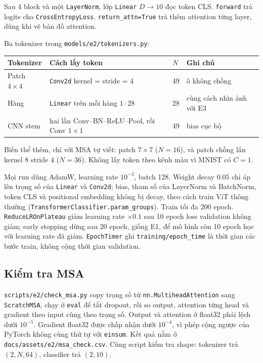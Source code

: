 Sau 4 block và một \texttt{LayerNorm}, lớp \texttt{Linear} \(D\to 10\) đọc token CLS. \texttt{forward} trả logits cho \texttt{CrossEntropyLoss}. \texttt{return\_attn=True} trả thêm attention từng layer, dùng khi vẽ bản đồ attention.

Ba tokenizer trong \texttt{models/e2/tokenizers.py}:
\begin{center}
\begin{tabular}{llll}
\hline
Tokenizer & Cách lấy token & \(N\) & Ghi chú \\
\hline
Patch \(4\times4\) & \texttt{Conv2d} kernel = stride = 4 & 49 & ô không chồng \\
Hàng & \texttt{Linear} trên mỗi hàng \(1\cdot 28\) & 28 & cùng cách nhìn ảnh với E3 \\
CNN stem & hai lần Conv--BN--ReLU--Pool, rồi Conv \(1\times1\) & 49 & bias cục bộ \\
\hline
\end{tabular}
\end{center}
Biến thể thêm, chỉ với MSA tự viết: patch \(7\times7\) (\(N=16\)), và patch chồng lấn kernel 8 stride 4 (\(N=36\)). Không lấy token theo kênh màu vì MNIST có \(C=1\).

Mọi run dùng AdamW, learning rate \(10^{-3}\), batch 128. Weight decay \(0.05\) chỉ áp lên trọng số của \texttt{Linear} và \texttt{Conv2d}; bias, tham số của LayerNorm và BatchNorm, token CLS và positional embedding không bị decay, theo cách train ViT thông thường (\texttt{TransformerClassifier.param\_groups}). Train tối đa 200 epoch. \texttt{ReduceLROnPlateau} giảm learning rate \(\times 0.1\) sau 10 epoch loss validation không giảm; early stopping dừng sau 20 epoch, giống E1, để mô hình còn 10 epoch học với learning rate đã giảm. \texttt{EpochTimer} ghi \texttt{training/epoch\_time} là thời gian các bước train, không cộng thời gian validation.

\subsection{Kiểm tra MSA}
\texttt{scripts/e2/check\_msa.py} copy trọng số từ \texttt{nn.MultiheadAttention} sang \texttt{ScratchMSA}, chạy ở \texttt{eval} để tắt dropout, rồi so output, attention từng head và gradient theo input cùng theo trọng số. Output và attention ở float32 phải lệch dưới \(10^{-5}\). Gradient float32 được chấp nhận dưới \(10^{-4}\), vì phép cộng ngược của PyTorch không cùng thứ tự với \texttt{einsum}. Kết quả nằm ở \texttt{docs/assets/e2/msa\_check.csv}. Cùng script kiểm tra shape: tokenizer trả \((2, N, 64)\), classifier trả \((2, 10)\).

